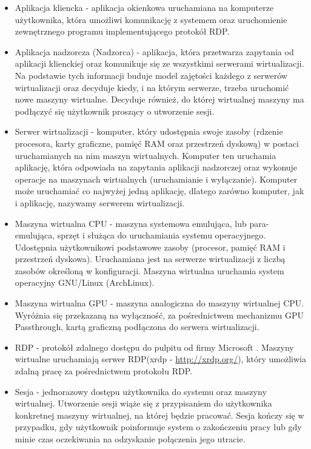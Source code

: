 \documentclass[../wstep.tex]{subfiles}
\begin{document}
\begin{itemize}
    \item Aplikacja kliencka - aplikacja okienkowa uruchamiana na komputerze użytkownika, która umożliwi komunikację z systemem oraz uruchomienie zewnętrznego programu implementującego protokół RDP.
    \item Aplikacja nadzorcza (Nadzorca) - aplikacja, która przetwarza zapytania od aplikacji klienckiej oraz komunikuje się ze wszystkimi serwerami wirtualizacji. Na podstawie tych informacji buduje model zajętości każdego z serwerów wirtualizacji oraz decyduje kiedy, i na którym serwerze, trzeba uruchomić nowe maszyny wirtualne. Decyduje również, do której wirtualnej maszyny ma podłączyć się użytkownik proszący o utworzenie sesji.
    \item Serwer wirtualizacji - komputer, który udostępnia swoje zasoby (rdzenie procesora, karty graficzne, pamięć RAM oraz przestrzeń dyskową) w postaci uruchamianych na nim maszyn wirtualnych. Komputer ten uruchamia aplikację, która odpowiada na zapytania aplikacji nadzorczej oraz wykonuje operacje na maszynach wirtualnych (uruchamianie i wyłączanie). Komputer może uruchamiać co najwyżej jedną aplikację, dlatego zarówno komputer, jak i aplikację, nazywamy serwerem wirtualizacji.
    \item Maszyna wirtualna CPU - maszyna systemowa emulująca, lub para-emulująca, sprzęt i służąca do uruchamiania systemu operacyjnego. Udostępnia użytkownikowi podstawowe zasoby (procesor, pamięć RAM i przestrzeń dyskowa). Uruchamiana jest na serwerze wirtualizacji z liczbą zasobów określoną w konfiguracji. Maszyna wirtualna uruchamia system operacyjny GNU/Linux (ArchLinux).
    \item Maszyna wirtualna GPU - maszyna analogiczna do maszyny wirtualnej CPU. Wyróżnia się przekazaną na wyłączność, za pośrednictwem mechanizmu GPU Passthrough, kartą graficzną podłączona do serwera wirtualizacji.
    \item RDP - protokół zdalnego dostępu do pulpitu od firmy Microsoft \parencite{rdp}. Maszyny wirtualne uruchamiają serwer RDP(xrdp - \url{http://xrdp.org/}), który umożliwia zdalną pracę za pośrednictwem protokołu RDP.
    \item Sesja - jednorazowy dostępu użytkownika do systemu oraz maszyny wirtualnej. Utworzenie sesji wiąże się z przypisaniem do użytkownika konkretnej maszyny wirtualnej, na której będzie pracować. Sesja kończy się w przypadku, gdy użytkownik poinformuje system o zakończeniu pracy lub gdy minie czas oczekiwania na odzyskanie połączenia jego utracie.

\end{itemize}
\end{document}
